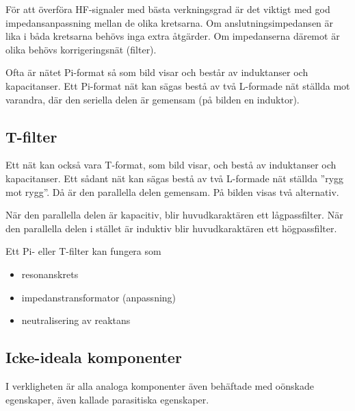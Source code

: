 
För att överföra HF-signaler med bästa verkningsgrad är det viktigt med god
impedansanpassning mellan de olika kretsarna.
Om anslutningsimpedansen är lika i båda kretsarna behövs inga extra åtgärder.
Om impedanserna däremot är olika behövs korrigeringsnät (filter).

Ofta är nätet Pi-format så som bild  visar och består av
induktanser och kapacitanser.
Ett Pi-format nät kan sägas bestå av två L-formade nät ställda mot varandra, där
den seriella delen är gemensam (på bilden en induktor).

\subsection{T-filter}


Ett nät kan också vara T-format, som bild  visar, och bestå
av induktanser och kapacitanser.
Ett sådant nät kan sägas bestå av två L-formade nät ställda ''rygg mot rygg''.
Då är den parallella delen gemensam.
På bilden visas två alternativ.

När den parallella delen är kapacitiv, blir huvudkaraktären ett lågpassfilter.
När den parallella delen i stället är induktiv blir huvudkaraktären ett högpassfilter.

Ett Pi- eller T-filter kan fungera som
\begin{itemize}
  \item resonanskrets
  \item impedanstransformator (anpassning)
  \item neutralisering av reaktans
\end{itemize}

\subsection{Icke-ideala komponenter}

I verkligheten är alla analoga komponenter även behäftade med oönskade
egenskaper, även kallade parasitiska egenskaper.

